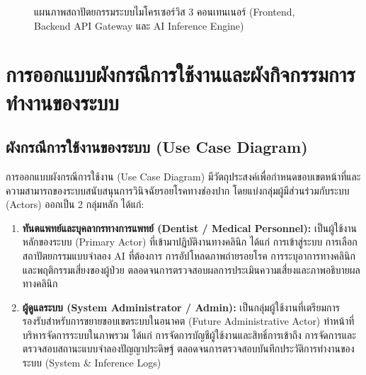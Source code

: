 \begin{figure}[htbp]
\centering
{}
\caption{แผนภาพสถาปัตยกรรมระบบไมโครเซอร์วิส 3 คอนเทนเนอร์ (Frontend, Backend API Gateway และ AI Inference Engine)}
\label{fig:system_architecture_diagram}
\end{figure}

\section{การออกแบบผังกรณีการใช้งานและผังกิจกรรมการทำงานของระบบ}
\label{sec:usecase_and_workflow}

\subsection{ผังกรณีการใช้งานของระบบ (Use Case Diagram)}
การออกแบบผังกรณีการใช้งาน (Use Case Diagram) มีวัตถุประสงค์เพื่อกำหนดขอบเขตหน้าที่และความสามารถของระบบสนับสนุนการวินิจฉัยรอยโรคทางช่องปาก โดยแบ่งกลุ่มผู้มีส่วนร่วมกับระบบ (Actors) ออกเป็น 2 กลุ่มหลัก ได้แก่:
\begin{enumerate}
    \item \textbf{ทันตแพทย์และบุคลากรทางการแพทย์ (Dentist / Medical Personnel):} เป็นผู้ใช้งานหลักของระบบ (Primary Actor) ที่เข้ามาปฏิบัติงานทางคลินิก ได้แก่ การเข้าสู่ระบบ การเลือกสถาปัตยกรรมแบบจำลอง AI ที่ต้องการ การอัปโหลดภาพถ่ายรอยโรค การระบุอาการทางคลินิกและพฤติกรรมเสี่ยงของผู้ป่วย ตลอดจนการตรวจสอบผลการประเมินความเสี่ยงและภาพอธิบายผลทางคลินิก
    \item \textbf{ผู้ดูแลระบบ (System Administrator / Admin):} เป็นกลุ่มผู้ใช้งานที่เตรียมการรองรับสำหรับการขยายขอบเขตระบบในอนาคต (Future Administrative Actor) ทำหน้าที่บริหารจัดการระบบในภาพรวม ได้แก่ การจัดการบัญชีผู้ใช้งานและสิทธิ์การเข้าถึง การจัดการและตรวจสอบสถานะแบบจำลองปัญญาประดิษฐ์ ตลอดจนการตรวจสอบบันทึกประวัติการทำงานของระบบ (System \& Inference Logs)
\end{enumerate}

